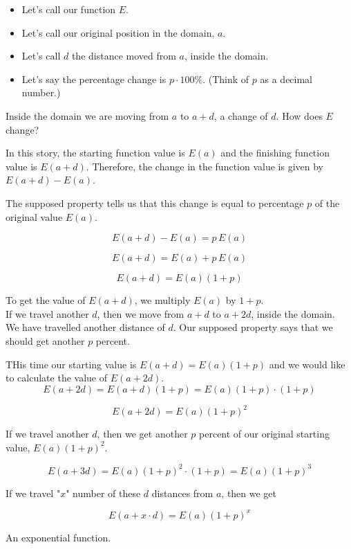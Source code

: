 \documentclass{ximera}
\begin{document}
\begin{observation}

\begin{itemize}
\item Let's call our function $E$.
\item Let's call our original position in the domain, $a$.
\item Let's call $d$ the distance moved from $a$, inside the domain.
\item Let's say the percentage change is $p \cdot 100\%$. (Think of $p$ as a decimal number.)
\end{itemize}



Inside the domain we are moving from $a$ to $a+d$, a change of $d$.  How does $E$ change?



In this story, the starting function value is $E(a)$ and the finishing function value is $E(a+d)$.  Therefore, the change in the function value is given by $E(a+d) - E(a)$.

The supposed property tells us that this change is equal to percentage $p$ of the original value $E(a)$.



\[
E(a+d) - E(a) = p \, E(a)
\]

\[
E(a+d) = E(a) + p \, E(a)
\]


\[
E(a+d) = E(a) (1+p)
\]



To get the value of $E(a+d)$, we multiply $E(a)$ by $1+p$. \\









If we travel another $d$, then we move from $a+d$ to $a+2d$, inside the domain. \\

We have travelled another distance of $d$. Our supposed property says that we should get another $p$ percent.



THis time our starting value is $E(a+d) = E(a) (1+p)$ and we would like to calculate the value of $E(a+2d)$. \\




\[
E(a + 2d) = E(a+d)(1+p)  = E(a) (1+p) \cdot (1+p)
\]



\[
E(a + 2d) =  E(a) (1+p)^2
\]


If we travel another $d$, then we get another $p$ percent of our original starting value, $E(a)(1+p)^2$.


\[
E(a + 3d) = E(a)(1+p)^2 \cdot (1+p) = E(a) (1+p)^3
\]



If we travel "$x$" number of these $d$ distances from $a$, then we get

\[
E(a + x \cdot d) = E(a)(1+p)^x 
\]

An exponential function.

\end{observation}
\end{document}

